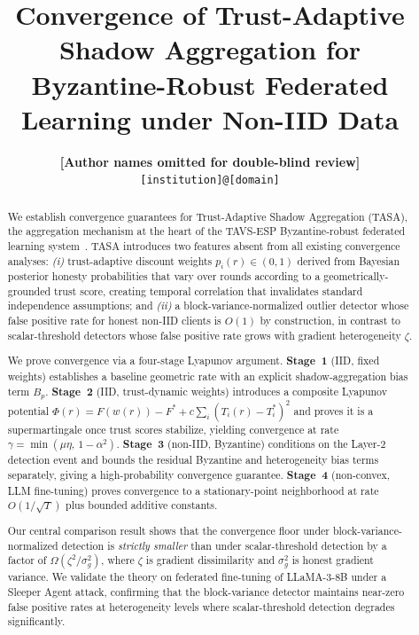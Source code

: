 \documentclass{article}
\title{%
  \textbf{Convergence of Trust-Adaptive Shadow Aggregation for}\\
  \textbf{Byzantine-Robust Federated Learning under Non-IID Data}%
}
\author{%
  \textbf{[Author names omitted for double-blind review]}\\
  \texttt{[institution]@[domain]}
}
\newcommand{\TAVESP}{\textsc{TAVS-ESP}}
\newcommand{\LyapV}{\Phi}
\begin{document}
\maketitle

\begin{abstract}
We establish convergence guarantees for Trust-Adaptive Shadow Aggregation
(TASA), the aggregation mechanism at the heart of the \TAVESP{} Byzantine-robust
federated learning system~\citep{paper1}.
TASA introduces two features absent from all existing convergence analyses:
\emph{(i)} trust-adaptive discount weights $p_i(r) \in (0,1)$ derived from
Bayesian posterior honesty probabilities that vary over rounds according to a
geometrically-grounded trust score, creating temporal correlation that
invalidates standard independence assumptions; and
\emph{(ii)} a block-variance-normalized outlier detector whose false positive
rate for honest non-IID clients is $O(1)$ by construction, in contrast to
scalar-threshold detectors whose false positive rate grows with gradient
heterogeneity $\zeta$.

We prove convergence via a four-stage Lyapunov argument.
\textbf{Stage~1} (IID, fixed weights) establishes a baseline geometric rate
with an explicit shadow-aggregation bias term $B_p$.
\textbf{Stage~2} (IID, trust-dynamic weights) introduces a composite
Lyapunov potential $\LyapV(r) = F(w(r)) - F^* + c\sum_i(T_i(r) - T_i^*)^2$
and proves it is a supermartingale once trust scores stabilize, yielding
convergence at rate $\gamma = \min(\mu\eta,\, 1-\alpha^2)$.
\textbf{Stage~3} (non-IID, Byzantine) conditions on the Layer-2 detection
event and bounds the residual Byzantine and heterogeneity bias terms
separately, giving a high-probability convergence guarantee.
\textbf{Stage~4} (non-convex, LLM fine-tuning) proves convergence to a
stationary-point neighborhood at rate $O(1/\sqrt{T})$ plus bounded additive
constants.

Our central comparison result shows that the convergence floor under
block-variance-normalized detection is \emph{strictly smaller} than under
scalar-threshold detection by a factor of $\Omega(\zeta^2 / \sigma_g^2)$,
where $\zeta$ is gradient dissimilarity and $\sigma_g^2$ is honest gradient
variance.
We validate the theory on federated fine-tuning of LLaMA-3-8B under a
Sleeper Agent attack, confirming that the block-variance detector maintains
near-zero false positive rates at heterogeneity levels where scalar-threshold
detection degrades significantly.
\end{abstract}
\end{document}
